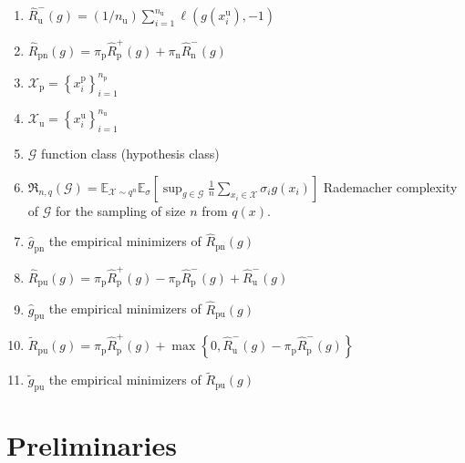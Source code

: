 \documentclass[12pt]{article}
\theoremstyle{definition}
\begin{document}
\begin{enumerate}
		
		\item  $\widehat{R}_{\mathrm{u}}^{-}(g)=\left(1 / n_{\mathrm{u}}\right) \sum_{i=1}^{n_{\mathrm{u}}} \ell\left(g\left(x_{i}^{\mathrm{u}}\right),-1\right)$
	
		\item  $\widehat{R}_{\mathrm{pn}}(g)=\pi_{\mathrm{p}} \widehat{R}_{\mathrm{p}}^{+}(g)+\pi_{\mathrm{n}} \widehat{R}_{\mathrm{n}}^{-}(g)$
	
		
	\item $\mathcal{X}_{\mathrm{p}}=\left\{x_{i}^{\mathrm{p}}\right\}_{i=1}^{n_{\mathrm{p}}} $
	
	\item  $\mathcal{X}_{\mathrm{u}}=\left\{x_{i}^{\mathrm{u}}\right\}_{i=1}^{n_{\mathrm{u}}} $


	

	
	\item $\mathcal{G}$ function class (hypothesis class)
	
	\item $\mathfrak{R}_{n, q}(\mathcal{G})=\mathbb{E}_{\mathcal{X} \sim q^{n}} \mathbb{E}_{\sigma}\left[\sup _{g \in \mathcal{G}} \frac{1}{n} \sum_{x_{i} \in \mathcal{X}} \sigma_{i} g\left(x_{i}\right)\right]$ Rademacher complexity of $\mathcal{G}$ for the sampling of size $n$ from $q(x)$.
	
	\item $\widehat{g}_\mathrm{pn}$ the empirical minimizers of $\widehat{R}_\mathrm{pn}(g)$
	
	\item 	$\widehat{R}_{\mathrm{pu}}(g)=\pi_{\mathrm{p}} \widehat{R}_{\mathrm{p}}^{+}(g)-\pi_{\mathrm{p}} \widehat{R}_{\mathrm{p}}^{-}(g)+\widehat{R}_{\mathrm{u}}^{-}(g)$
	
	\item $\widehat{g}_\mathrm{pu}$ the empirical minimizers of $\widehat{R}_\mathrm{pu}(g)$
	
	\item $ \widetilde{R}_{\mathrm{pu}}(g)=\pi_{\mathrm{p}} \widehat{R}_{\mathrm{p}}^{+}(g)+\max \left\{0, \widehat{R}_{\mathrm{u}}^{-}(g)-\pi_{\mathrm{p}} \widehat{R}_{\mathrm{p}}^{-}(g)\right\}$
		
	\item $\widetilde{g}_\mathrm{pu}$ the empirical minimizers of $\widetilde{R}_\mathrm{pu}(g)$
\end{enumerate}

\section{Preliminaries}
\end{document}
